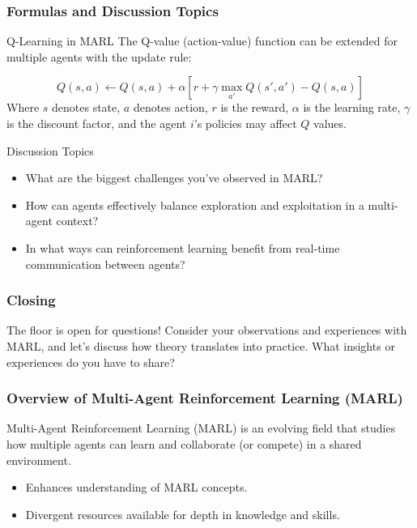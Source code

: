 \documentclass[aspectratio=169]{beamer}
\begin{document}
\begin{frame}[fragile]
    \frametitle{Formulas and Discussion Topics}
    \begin{block}{Q-Learning in MARL}
        The Q-value (action-value) function can be extended for multiple agents with the update rule:

        \begin{equation}
            Q(s, a) \gets Q(s, a) + \alpha [r + \gamma \max_{a'}Q(s', a') - Q(s, a)]
        \end{equation}
        Where \( s \) denotes state, \( a \) denotes action, \( r \) is the reward, \( \alpha \) is the learning rate, \( \gamma \) is the discount factor, and the agent \( i \)'s policies may affect \( Q \) values.
    \end{block}

    \begin{block}{Discussion Topics}
        \begin{itemize}
            \item What are the biggest challenges you've observed in MARL?
            \item How can agents effectively balance exploration and exploitation in a multi-agent context?
            \item In what ways can reinforcement learning benefit from real-time communication between agents?
        \end{itemize}
    \end{block}
\end{frame}

\begin{frame}[fragile]
    \frametitle{Closing}
    The floor is open for questions! Consider your observations and experiences with MARL, and let’s discuss how theory translates into practice. What insights or experiences do you have to share?
\end{frame}

\begin{frame}
    \frametitle{Overview of Multi-Agent Reinforcement Learning (MARL)}
    Multi-Agent Reinforcement Learning (MARL) is an evolving field that studies how multiple agents can learn and collaborate (or compete) in a shared environment. 
    \begin{itemize}
        \item Enhances understanding of MARL concepts.
        \item Divergent resources available for depth in knowledge and skills.
    \end{itemize}
\end{frame}
\end{document}
